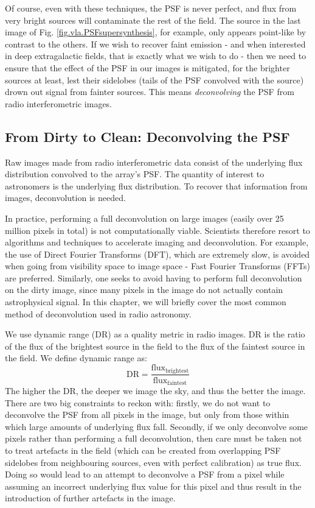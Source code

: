 \pg
Of course, even with these techniques, the PSF is never perfect, and flux from very bright sources will contaminate the rest of the field. The source in the last image of Fig. \ref{fig.vla.PSFsupersynthesis}, for example, only appears point-like by contrast to the others. If we wish to recover faint emission - and when interested in deep extragalactic fields, that is exactly what we wish to do - then we need to ensure that the effect of the PSF in our images is mitigated, for the brighter sources at least, lest their sidelobes (tails of the PSF convolved with the source) drown out signal from fainter sources. This means \emph{deconvolving} the PSF from radio interferometric images.

\subsection{From Dirty to Clean: Deconvolving the PSF}\label{section.clean}

\pg
Raw images made from radio interferometric data consist of the underlying flux distribution convolved to the array's PSF. The quantity of interest to astronomers is the underlying flux distribution. To recover that information from images, deconvolution is needed.

\pg
In practice, performing a full deconvolution on large images (easily over 25 million pixels in total) is not computationally viable. Scientists therefore resort to algorithms and techniques to accelerate imaging and deconvolution. For example, the use of Direct Fourier Transforms (DFT), which are extremely slow, is avoided when going from visibility space to image space - Fast Fourier Transforms (FFTs) are preferred. Similarly, one seeks to avoid having to perform full deconvolution on the dirty image, since many pixels in the image do not actually contain astrophysical signal. In this chapter, we will briefly cover the most common method of deconvolution used in radio astronomy.

\pg
We use dynamic range (DR) as a quality metric in radio images. DR is the ratio of the flux of the brightest source in the field to the flux of the faintest source in the field.  We define dynamic range as:
\begin{equation}\label{eq.DR.imag}
\mathrm{DR} = \frac{\mathrm{flux}_\mathrm{brightest}}{\mathrm{flux}_\mathrm{faintest}}
\end{equation}
The higher the DR, the deeper we image the sky, and thus the better the image. There are two big constraints to reckon with: firstly, we do not want to deconvolve the PSF from all pixels in the image, but only from those within which large amounts of underlying flux fall. Secondly, if we only deconvolve some pixels rather than performing a full deconvolution, then care must be taken not to treat artefacts in the field (which can be created from overlapping PSF sidelobes from neighbouring sources, even with perfect calibration) as true flux. Doing so would lead to an attempt to deconvolve a PSF from a pixel while assuming an incorrect underlying flux value for this pixel and thus result in the introduction of further artefacts in the image.

